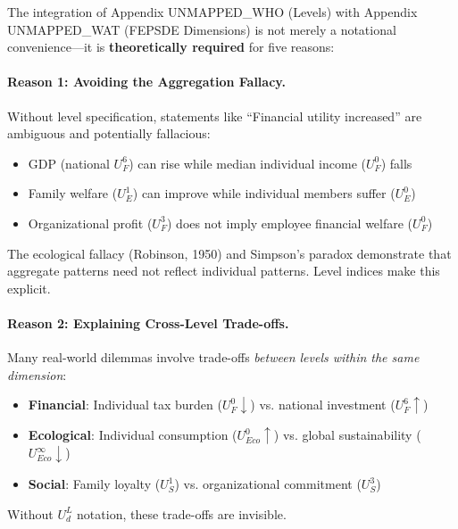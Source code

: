 \begin{tcolorbox}[colback=gray!5!white, colframe=gray!75!black, 
    title=Why AAA $\times$ C Is Theoretically Necessary]

The integration of Appendix UNMAPPED_WHO (Levels) with Appendix UNMAPPED_WAT (FEPSDE Dimensions) is not 
merely a notational convenience---it is \textbf{theoretically required} for five reasons:

\paragraph{Reason 1: Avoiding the Aggregation Fallacy.}

Without level specification, statements like ``Financial utility increased'' are 
ambiguous and potentially fallacious:
\begin{itemize}[nosep]
\item GDP (national $U^6_F$) can rise while median individual income ($U^0_F$) falls
\item Family welfare ($U^1_E$) can improve while individual members suffer ($U^0_E$)
\item Organizational profit ($U^3_F$) does not imply employee financial welfare ($U^0_F$)
\end{itemize}

The ecological fallacy (Robinson, 1950) and Simpson's paradox demonstrate that 
aggregate patterns need not reflect individual patterns. Level indices make this explicit.

\paragraph{Reason 2: Explaining Cross-Level Trade-offs.}

Many real-world dilemmas involve trade-offs \textit{between levels within the same dimension}:
\begin{itemize}[nosep]
\item \textbf{Financial}: Individual tax burden ($U^0_F \downarrow$) vs. national investment ($U^6_F \uparrow$)
\item \textbf{Ecological}: Individual consumption ($U^0_{Eco} \uparrow$) vs. global sustainability ($U^{\infty}_{Eco} \downarrow$)
\item \textbf{Social}: Family loyalty ($U^1_S$) vs. organizational commitment ($U^3_S$)
\end{itemize}

Without $U^L_d$ notation, these trade-offs are invisible.


\end{tcolorbox}
